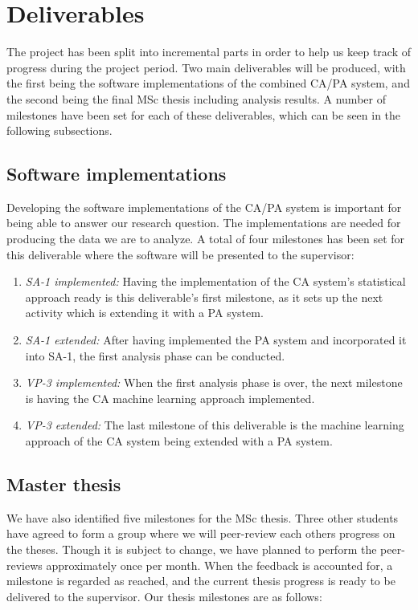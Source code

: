 \documentclass[informationsecurity]{gucmasterproject}
\begin{document}
\section{Deliverables}
\label{sec:milestones-deliverables}
The project has been split into incremental parts in order to help us keep track of progress during the project period.
Two main deliverables will be produced, with the first being the software implementations of the combined CA/PA system, and the second being the final MSc thesis including analysis results.
A number of milestones have been set for each of these deliverables, which can be seen in the following subsections.

\subsection{Software implementations}
\label{sec:milestones-deliverables-software}
Developing the software implementations of the CA/PA system is important for being able to answer our research question.
The implementations are needed for producing the data we are to analyze.
A total of four milestones has been set for this deliverable where the software will be presented to the supervisor:

\begin{enumerate}
    \item \textit{SA-1 implemented:} Having the implementation of the CA system's statistical approach ready is this deliverable's first milestone, as it sets up the next activity which is extending it with a PA system.
    \item \textit{SA-1 extended:} After having implemented the PA system and incorporated it into SA-1, the first analysis phase can be conducted.
    \item \textit{VP-3 implemented:} When the first analysis phase is over, the next milestone is having the CA machine learning approach implemented.
    \item \textit{VP-3 extended:} The last milestone of this deliverable is the machine learning approach of the CA system being extended with a PA system.
\end{enumerate}

\subsection{Master thesis}
\label{sec:milestones-deliverables-thesis}
We have also identified five milestones for the MSc thesis. 
Three other students have agreed to form a group where we will peer-review each others progress on the theses. 
Though it is subject to change, we have planned to perform the peer-reviews approximately once per month.
When the feedback is accounted for, a milestone is regarded as reached, and the current thesis progress is ready to be delivered to the supervisor.
Our thesis milestones are as follows:
\end{document}
